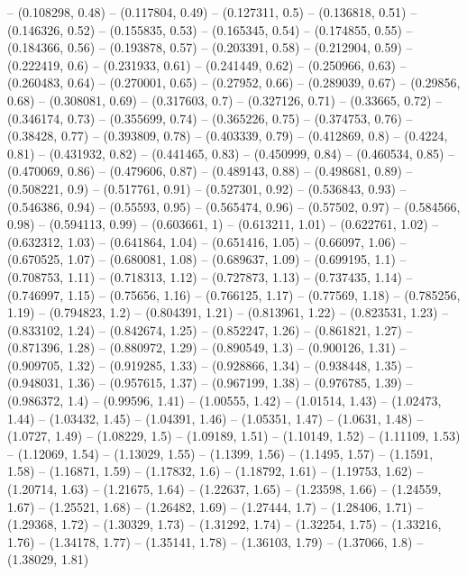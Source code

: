 -- (0.108298, 0.48)
-- (0.117804, 0.49)
-- (0.127311, 0.5)
-- (0.136818, 0.51)
-- (0.146326, 0.52)
-- (0.155835, 0.53)
-- (0.165345, 0.54)
-- (0.174855, 0.55)
-- (0.184366, 0.56)
-- (0.193878, 0.57)
-- (0.203391, 0.58)
-- (0.212904, 0.59)
-- (0.222419, 0.6)
-- (0.231933, 0.61)
-- (0.241449, 0.62)
-- (0.250966, 0.63)
-- (0.260483, 0.64)
-- (0.270001, 0.65)
-- (0.27952, 0.66)
-- (0.289039, 0.67)
-- (0.29856, 0.68)
-- (0.308081, 0.69)
-- (0.317603, 0.7)
-- (0.327126, 0.71)
-- (0.33665, 0.72)
-- (0.346174, 0.73)
-- (0.355699, 0.74)
-- (0.365226, 0.75)
-- (0.374753, 0.76)
-- (0.38428, 0.77)
-- (0.393809, 0.78)
-- (0.403339, 0.79)
-- (0.412869, 0.8)
-- (0.4224, 0.81)
-- (0.431932, 0.82)
-- (0.441465, 0.83)
-- (0.450999, 0.84)
-- (0.460534, 0.85)
-- (0.470069, 0.86)
-- (0.479606, 0.87)
-- (0.489143, 0.88)
-- (0.498681, 0.89)
-- (0.508221, 0.9)
-- (0.517761, 0.91)
-- (0.527301, 0.92)
-- (0.536843, 0.93)
-- (0.546386, 0.94)
-- (0.55593, 0.95)
-- (0.565474, 0.96)
-- (0.57502, 0.97)
-- (0.584566, 0.98)
-- (0.594113, 0.99)
-- (0.603661, 1)
-- (0.613211, 1.01)
-- (0.622761, 1.02)
-- (0.632312, 1.03)
-- (0.641864, 1.04)
-- (0.651416, 1.05)
-- (0.66097, 1.06)
-- (0.670525, 1.07)
-- (0.680081, 1.08)
-- (0.689637, 1.09)
-- (0.699195, 1.1)
-- (0.708753, 1.11)
-- (0.718313, 1.12)
-- (0.727873, 1.13)
-- (0.737435, 1.14)
-- (0.746997, 1.15)
-- (0.75656, 1.16)
-- (0.766125, 1.17)
-- (0.77569, 1.18)
-- (0.785256, 1.19)
-- (0.794823, 1.2)
-- (0.804391, 1.21)
-- (0.813961, 1.22)
-- (0.823531, 1.23)
-- (0.833102, 1.24)
-- (0.842674, 1.25)
-- (0.852247, 1.26)
-- (0.861821, 1.27)
-- (0.871396, 1.28)
-- (0.880972, 1.29)
-- (0.890549, 1.3)
-- (0.900126, 1.31)
-- (0.909705, 1.32)
-- (0.919285, 1.33)
-- (0.928866, 1.34)
-- (0.938448, 1.35)
-- (0.948031, 1.36)
-- (0.957615, 1.37)
-- (0.967199, 1.38)
-- (0.976785, 1.39)
-- (0.986372, 1.4)
-- (0.99596, 1.41)
-- (1.00555, 1.42)
-- (1.01514, 1.43)
-- (1.02473, 1.44)
-- (1.03432, 1.45)
-- (1.04391, 1.46)
-- (1.05351, 1.47)
-- (1.0631, 1.48)
-- (1.0727, 1.49)
-- (1.08229, 1.5)
-- (1.09189, 1.51)
-- (1.10149, 1.52)
-- (1.11109, 1.53)
-- (1.12069, 1.54)
-- (1.13029, 1.55)
-- (1.1399, 1.56)
-- (1.1495, 1.57)
-- (1.1591, 1.58)
-- (1.16871, 1.59)
-- (1.17832, 1.6)
-- (1.18792, 1.61)
-- (1.19753, 1.62)
-- (1.20714, 1.63)
-- (1.21675, 1.64)
-- (1.22637, 1.65)
-- (1.23598, 1.66)
-- (1.24559, 1.67)
-- (1.25521, 1.68)
-- (1.26482, 1.69)
-- (1.27444, 1.7)
-- (1.28406, 1.71)
-- (1.29368, 1.72)
-- (1.30329, 1.73)
-- (1.31292, 1.74)
-- (1.32254, 1.75)
-- (1.33216, 1.76)
-- (1.34178, 1.77)
-- (1.35141, 1.78)
-- (1.36103, 1.79)
-- (1.37066, 1.8)
-- (1.38029, 1.81)
